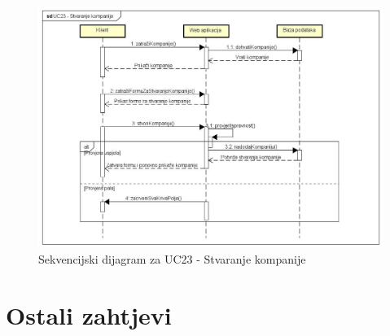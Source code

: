 				\begin{figure}[H]
					\includegraphics[scale=0.3]{slike/Sekvencijski dijagrami/UC23 - Stvaranje kompanije}
					\centering
					\caption{Sekvencijski dijagram za UC23 - Stvaranje kompanije}
					\label{fig:UC23}
				\end{figure}

			\eject
	
		\section{Ostali zahtjevi}
		


